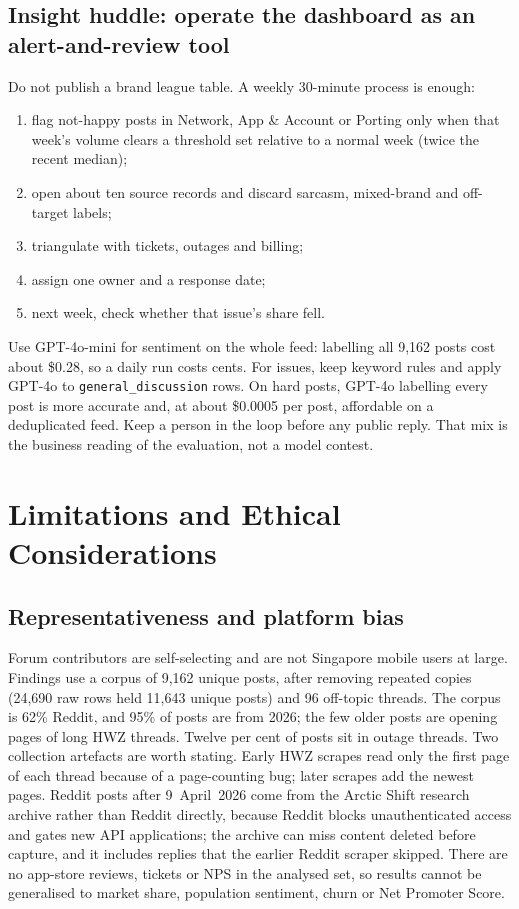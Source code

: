 \documentclass[11pt,a4paper]{article}
\begin{document}
\subsection{Insight huddle: operate the dashboard as an alert-and-review tool}

Do not publish a brand league table. A weekly 30-minute process is enough:

\begin{enumerate}
  \item flag not-happy posts in Network, App \& Account or Porting only when that week's volume clears a threshold set relative to a normal week (twice the recent median);
  \item open about ten source records and discard sarcasm, mixed-brand and off-target labels;
  \item triangulate with tickets, outages and billing;
  \item assign one owner and a response date;
  \item next week, check whether that issue's share fell.
\end{enumerate}

Use GPT-4o-mini for sentiment on the whole feed: labelling all 9,162 posts cost about \$0.28, so a daily run costs cents. For issues, keep keyword rules and apply GPT-4o to \texttt{general\_discussion} rows. On hard posts, GPT-4o labelling every post is more accurate and, at about \$0.0005 per post, affordable on a deduplicated feed. Keep a person in the loop before any public reply. That mix is the business reading of the evaluation, not a model contest.

\section{Limitations and Ethical Considerations}

\subsection{Representativeness and platform bias}

Forum contributors are self-selecting and are not Singapore mobile users at large. Findings use a corpus of 9,162 unique posts, after removing repeated copies (24,690 raw rows held 11,643 unique posts) and 96 off-topic threads. The corpus is 62\% Reddit, and 95\% of posts are from 2026; the few older posts are opening pages of long HWZ threads. Twelve per cent of posts sit in outage threads. Two collection artefacts are worth stating. Early HWZ scrapes read only the first page of each thread because of a page-counting bug; later scrapes add the newest pages. Reddit posts after 9~April~2026 come from the Arctic Shift research archive rather than Reddit directly, because Reddit blocks unauthenticated access and gates new API applications; the archive can miss content deleted before capture, and it includes replies that the earlier Reddit scraper skipped. There are no app-store reviews, tickets or NPS in the analysed set, so results cannot be generalised to market share, population sentiment, churn or Net Promoter Score.
\end{document}
